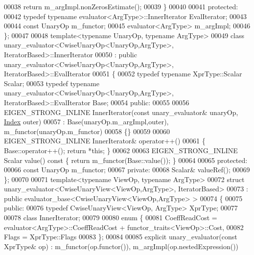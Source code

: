 \begin{DoxyCode}
00038       \textcolor{keywordflow}{return} m\_argImpl.nonZerosEstimate();
00039     \}
00040 
00041   \textcolor{keyword}{protected}:
00042     \textcolor{keyword}{typedef} \textcolor{keyword}{typename} evaluator<ArgType>::InnerIterator        EvalIterator;
00043     
00044     \textcolor{keyword}{const} UnaryOp m\_functor;
00045     evaluator<ArgType> m\_argImpl;
00046 \};
00047 
00048 \textcolor{keyword}{template}<\textcolor{keyword}{typename} UnaryOp, \textcolor{keyword}{typename} ArgType>
00049 \textcolor{keyword}{class }unary\_evaluator<CwiseUnaryOp<UnaryOp,ArgType>, IteratorBased>::InnerIterator
00050     : \textcolor{keyword}{public} unary\_evaluator<CwiseUnaryOp<UnaryOp,ArgType>, IteratorBased>::EvalIterator
00051 \{
00052     \textcolor{keyword}{typedef} \textcolor{keyword}{typename} XprType::Scalar Scalar;
00053     \textcolor{keyword}{typedef} \textcolor{keyword}{typename} unary\_evaluator<CwiseUnaryOp<UnaryOp,ArgType>, IteratorBased>::EvalIterator Base;
00054   \textcolor{keyword}{public}:
00055 
00056     EIGEN\_STRONG\_INLINE InnerIterator(\textcolor{keyword}{const} unary\_evaluator& unaryOp, \hyperlink{namespace_eigen_a62e77e0933482dafde8fe197d9a2cfde}{Index} outer)
00057       : Base(unaryOp.m\_argImpl,outer), m\_functor(unaryOp.m\_functor)
00058     \{\}
00059 
00060     EIGEN\_STRONG\_INLINE InnerIterator& operator++()
00061     \{ Base::operator++(); \textcolor{keywordflow}{return} *\textcolor{keyword}{this}; \}
00062 
00063     EIGEN\_STRONG\_INLINE Scalar value()\textcolor{keyword}{ const }\{ \textcolor{keywordflow}{return} m\_functor(Base::value()); \}
00064 
00065   \textcolor{keyword}{protected}:
00066     \textcolor{keyword}{const} UnaryOp m\_functor;
00067   \textcolor{keyword}{private}:
00068     Scalar& valueRef();
00069 \};
00070 
00071 \textcolor{keyword}{template}<\textcolor{keyword}{typename} ViewOp, \textcolor{keyword}{typename} ArgType>
00072 \textcolor{keyword}{struct }unary\_evaluator<CwiseUnaryView<ViewOp,ArgType>, IteratorBased>
00073   : \textcolor{keyword}{public} evaluator\_base<CwiseUnaryView<ViewOp,ArgType> >
00074 \{
00075   \textcolor{keyword}{public}:
00076     \textcolor{keyword}{typedef} CwiseUnaryView<ViewOp, ArgType> XprType;
00077 
00078     \textcolor{keyword}{class }InnerIterator;
00079     
00080     \textcolor{keyword}{enum} \{
00081       CoeffReadCost = evaluator<ArgType>::CoeffReadCost + functor\_traits<ViewOp>::Cost,
00082       Flags = XprType::Flags
00083     \};
00084     
00085     \textcolor{keyword}{explicit} unary\_evaluator(\textcolor{keyword}{const} XprType& op) : m\_functor(op.functor()), m\_argImpl(op.nestedExpression())

\end{DoxyCode}
